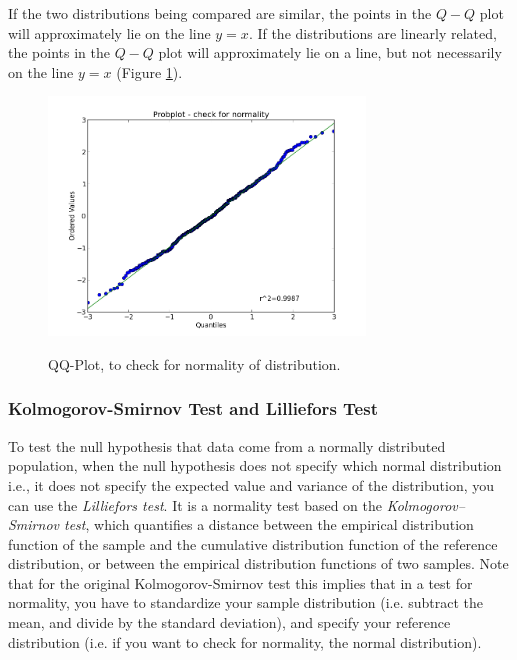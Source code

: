 If the two distributions being compared are similar, the points in the $Q-Q$ plot will approximately lie on the line $y = x$. If the distributions are linearly related, the points in the $Q-Q$ plot will approximately lie on a line, but not necessarily on the line $y = x$ (Figure \ref{fig:qqplot}).

\begin{figure}
  \centering
  \includegraphics[width=0.75\textwidth]{../Images/ProbPlot.png}\\
  \caption{QQ-Plot, to check for normality of distribution.}\label{fig:qqplot}
\end{figure}

\subsubsection{Kolmogorov-Smirnov Test and Lilliefors Test}

To test the null hypothesis that data come from a normally distributed population, when the null hypothesis does not specify which normal distribution i.e., it does not specify the expected value and variance of the distribution, you can use the \emph{Lilliefors test}. It is a normality test based on the \emph{Kolmogorov--Smirnov test}, which quantifies a distance between the empirical distribution function of the sample and the cumulative distribution function of the reference distribution, or between the empirical distribution functions of two samples. Note that for the original Kolmogorov-Smirnov test this implies that in a test for normality, you have to standardize your sample distribution (i.e. subtract the mean, and divide by the standard deviation), and specify your reference distribution (i.e. if you want to check for normality, the normal distribution).


